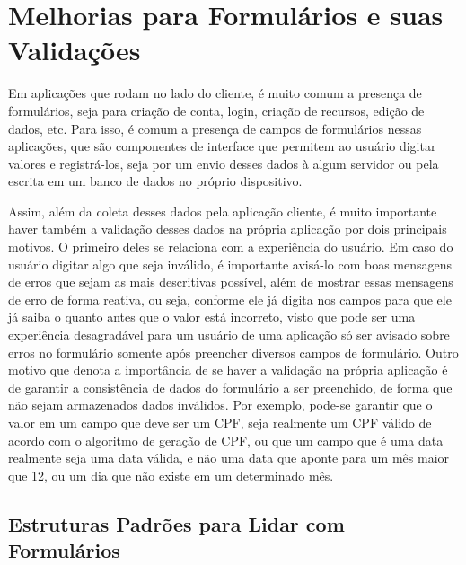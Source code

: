 \documentclass[12pt, %
openright, 
oneside, %
a4paper,    %
brazil]{facom-ufu-abntex2}
\begin{document}
\section{Melhorias para Formulários e suas Validações} \label{sec:forms}

Em aplicações que rodam no lado do cliente, é muito comum a presença de formulários, seja para criação de conta, login, criação de recursos, edição de dados, etc. Para isso, é comum a presença de campos de formulários nessas aplicações, que são componentes de interface que permitem ao usuário digitar valores e registrá-los, seja por um envio desses dados à algum servidor ou pela escrita em um banco de dados no próprio dispositivo.

Assim, além da coleta desses dados pela aplicação cliente, é muito importante haver também a validação desses dados na própria aplicação por dois principais motivos. O primeiro deles se relaciona com a experiência do usuário. Em caso do usuário digitar algo que seja inválido, é importante avisá-lo com boas mensagens de erros que sejam as mais descritivas possível, além de mostrar essas mensagens de erro de forma reativa, ou seja, conforme ele já digita nos campos para que ele já saiba o quanto antes que o valor está incorreto, visto que pode ser uma experiência desagradável para um usuário de uma aplicação só ser avisado sobre erros no formulário somente após preencher diversos campos de formulário. Outro motivo que denota a importância de se haver a validação na própria aplicação é de garantir a consistência de dados do formulário a ser preenchido, de forma que não sejam armazenados dados inválidos. Por exemplo, pode-se garantir que o valor em um campo que deve ser um CPF, seja realmente um CPF válido de acordo com o algoritmo de geração de CPF, ou que um campo que é uma data realmente seja uma data válida, e não uma data que aponte para um mês maior que 12, ou um dia que não existe em um determinado mês.

\subsection{Estruturas Padrões para Lidar com Formulários}
\end{document}
